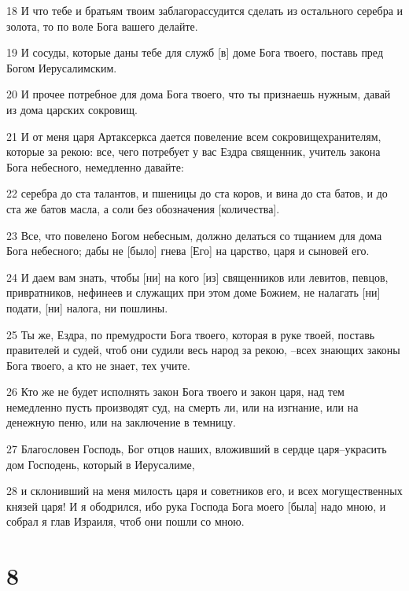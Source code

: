 \par 18 И что тебе и братьям твоим заблагорассудится сделать из остального серебра и золота, то по воле Бога вашего делайте.
\par 19 И сосуды, которые даны тебе для служб [в] доме Бога твоего, поставь пред Богом Иерусалимским.
\par 20 И прочее потребное для дома Бога твоего, что ты признаешь нужным, давай из дома царских сокровищ.
\par 21 И от меня царя Артаксеркса дается повеление всем сокровищехранителям, которые за рекою: все, чего потребует у вас Ездра священник, учитель закона Бога небесного, немедленно давайте:
\par 22 серебра до ста талантов, и пшеницы до ста коров, и вина до ста батов, и до ста же батов масла, а соли без обозначения [количества].
\par 23 Все, что повелено Богом небесным, должно делаться со тщанием для дома Бога небесного; дабы не [было] гнева [Его] на царство, царя и сыновей его.
\par 24 И даем вам знать, чтобы [ни] на кого [из] священников или левитов, певцов, привратников, нефинеев и служащих при этом доме Божием, не налагать [ни] подати, [ни] налога, ни пошлины.
\par 25 Ты же, Ездра, по премудрости Бога твоего, которая в руке твоей, поставь правителей и судей, чтоб они судили весь народ за рекою, --всех знающих законы Бога твоего, а кто не знает, тех учите.
\par 26 Кто же не будет исполнять закон Бога твоего и закон царя, над тем немедленно пусть производят суд, на смерть ли, или на изгнание, или на денежную пеню, или на заключение в темницу.
\par 27 Благословен Господь, Бог отцов наших, вложивший в сердце царя--украсить дом Господень, который в Иерусалиме,
\par 28 и склонивший на меня милость царя и советников его, и всех могущественных князей царя! И я ободрился, ибо рука Господа Бога моего [была] надо мною, и собрал я глав Израиля, чтоб они пошли со мною.

\chapter{8}

